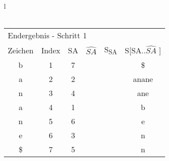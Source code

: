 \begin{table}[H]
\begin{center}
\begin{tabular}{l}
\\
\\

\begin{tabular}{cccccc}
\multicolumn{6}{l}{Endergebnis - Schritt 1}                                                                                                                 \\
\cellcolor[HTML]{\green}Zeichen & \cellcolor[HTML]{\yellow}Index & \cellcolor[HTML]{\gray}SA & $ \widehat{SA} $ & S\textsubscript{SA} & \cellcolor[HTML]{\red}S{[}SA..$ \widehat{SA} $ {]} \\
\cellcolor[HTML]{\green}b       & \cellcolor[HTML]{\yellow}1     & \cellcolor[HTML]{\gray}7  &    &     & \cellcolor[HTML]{\red}\$            \\
\cellcolor[HTML]{\green}a       & \cellcolor[HTML]{\yellow}2     & \cellcolor[HTML]{\gray}2  &    &     & \cellcolor[HTML]{\red}anane         \\
\cellcolor[HTML]{\green}n       & \cellcolor[HTML]{\yellow}3     & \cellcolor[HTML]{\gray}4  &    &     & \cellcolor[HTML]{\red}ane           \\
\cellcolor[HTML]{\green}a       & \cellcolor[HTML]{\yellow}4     & \cellcolor[HTML]{\gray}1  &    &     & \cellcolor[HTML]{\red}b             \\
\cellcolor[HTML]{\green}n       & \cellcolor[HTML]{\yellow}5     & \cellcolor[HTML]{\gray}6  &    &     & \cellcolor[HTML]{\red}e             \\
\cellcolor[HTML]{\green}e       & \cellcolor[HTML]{\yellow}6     & \cellcolor[HTML]{\gray}3  &    &     & \cellcolor[HTML]{\red}n             \\
\cellcolor[HTML]{\green}\$      & \cellcolor[HTML]{\yellow}7     & \cellcolor[HTML]{\gray}5  &    &     & \cellcolor[HTML]{\red}n            
\end{tabular}

\\
\\


\end{tabular}
\end{center}
\end{table}
